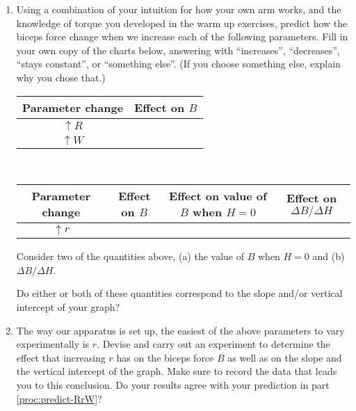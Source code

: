\documentclass[11pt,letterpaper]{article}
\newcommand{\question}[2][blue]{\textcolor{#1}{#2}}
\newcommand{\yint}[1][]{vertical intercept\xspace}
\renewcommand{\question}[2][]{#2}
\begin{document}
\begin{enumerate}[labproc]
\item \label{proc:predict-RrW}
Using a combination of your intuition for how your own arm works,
and the knowledge of torque you developed in the warm up exercises,
\question{predict how the biceps force change when we increase 
each of the following parameters. }
Fill in your own copy of the charts below, 
answering with ``increases'', ``decreases'', 
``stays constant'', or ``something else''.  
(If you choose something else, explain why you chose that.)
\vspace{.5cm}
\\
\begin{tabular}{|c||c|}
	\hline
	Parameter change & Effect on $B$ 
	\\ \hline \hline
	$\uparrow R$ 
	& %
	\\ \hline
	$\uparrow W$ 
	& %
	\\ \hline
\end{tabular}\\
\vspace{1cm}
\begin{tabular}{|c||c|c|c|}
	\hline
	Parameter change & Effect on $B$ 
	& Effect on value of $B$ when $H=0$
	& Effect on $\Delta B/\Delta H$ 
	\\ \hline \hline
	$\uparrow r$ 
	& & & 
	\\ \hline
\end{tabular}

Consider two of the quantities above, 
(a) the value of $B$ when $H=0$ 
and (b) $\Delta B/\Delta H$.
\question{
Do either or both of these quantities
correspond to the slope and/or vertical intercept of your graph?}


\item
The way our apparatus is set up, 
the easiest of the above parameters to vary experimentally is $r$.
Devise and carry out an experiment to 
\question{determine the effect that increasing $r$
has on the biceps force $B$ as well as 
on the slope and the \yint  of the graph.}
Make sure to record the data that leads you to this conclusion.
Do your results agree with your prediction 
in part \ref{proc:predict-RrW}?


\end{enumerate}
\end{document}
